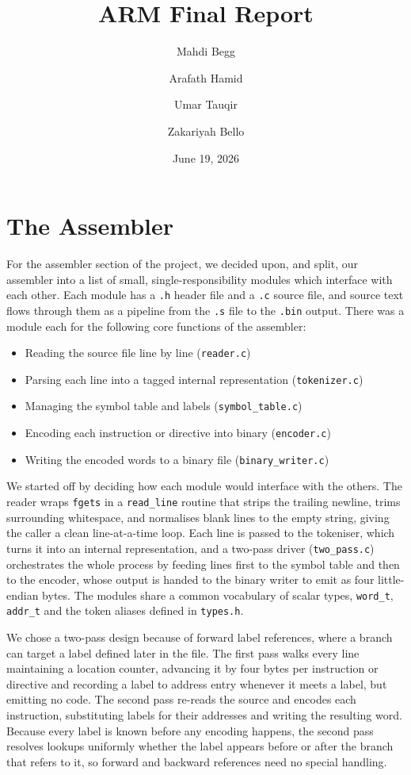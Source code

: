 \documentclass[11pt]{article}
\title{ARM Final Report}
\author{Mahdi Begg \and Arafath Hamid \and Umar Tauqir \and Zakariyah Bello}
\date{June 19, 2026}
\newcommand{\code}[1]{\texttt{#1}}
\begin{document}
\maketitle

\section{The Assembler}

For the assembler section of the project, we decided upon, and split, our assembler into a list of small, single-responsibility modules which interface with each other. Each module has a \code{.h} header file and a \code{.c} source file, and source text flows through them as a pipeline from the \code{.s} file to the \code{.bin} output. There was a module each for the following core functions of the assembler:

\begin{itemize}
\item Reading the source file line by line (\code{reader.c})
\item Parsing each line into a tagged internal representation (\code{tokenizer.c})
\item Managing the symbol table and labels (\code{symbol\_table.c})
\item Encoding each instruction or directive into binary (\code{encoder.c})
\item Writing the encoded words to a binary file (\code{binary\_writer.c})
\end{itemize}

We started off by deciding how each module would interface with the others. The reader wraps \code{fgets} in a \code{read\_line} routine that strips the trailing newline, trims surrounding whitespace, and normalises blank lines to the empty string, giving the caller a clean line-at-a-time loop. Each line is passed to the tokeniser, which turns it into an internal representation, and a two-pass driver (\code{two\_pass.c}) orchestrates the whole process by feeding lines first to the symbol table and then to the encoder, whose output is handed to the binary writer to emit as four little-endian bytes. The modules share a common vocabulary of scalar types, \code{word\_t}, \code{addr\_t} and the token aliases defined in \code{types.h}.

We chose a two-pass design because of forward label references, where a branch can target a label defined later in the file. The first pass walks every line maintaining a location counter, advancing it by four bytes per instruction or directive and recording a label to address entry whenever it meets a label, but emitting no code. The second pass re-reads the source and encodes each instruction, substituting labels for their addresses and writing the resulting word. Because every label is known before any encoding happens, the second pass resolves lookups uniformly whether the label appears before or after the branch that refers to it, so forward and backward references need no special handling.
\end{document}
